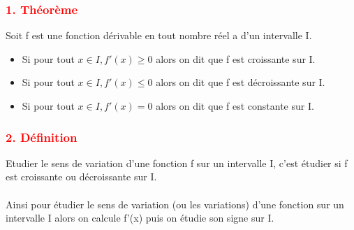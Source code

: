 \documentclass[12pt]{article}
\begin{document}
\subsubsection*{\textcolor{red}{1. Théorème}}
Soit f est une fonction dérivable en tout nombre réel a d’un intervalle I.\\
\begin{itemize}
\item Si pour tout $x \in I, f'(x)\geq 0$ alors on dit que f est croissante sur I.
\item Si pour tout $x \in I, f'(x)\leq 0$ alors on dit que f est décroissante sur I.
\item Si pour tout $x \in I, f'(x)=0$ alors on dit que f est constante sur I.
\end{itemize}
\subsubsection*{\textcolor{red}{2. Définition}}
Etudier le sens de variation d’une fonction f sur un intervalle I, c’est étudier si f est croissante ou décroissante sur I.\\\\
Ainsi pour étudier le sens de variation (ou les variations) d’une fonction sur un intervalle I alors on calcule f'(x) puis on étudie son signe sur I.\\
\end{document}
